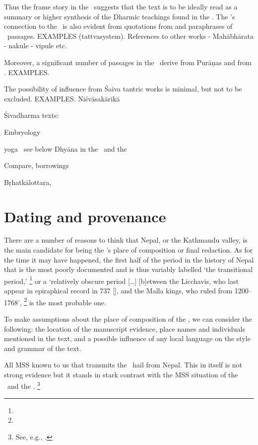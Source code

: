 \noindent
Thus the frame story in the \VSS\ suggests
that the text is to be ideally read as a summary 
or higher synthesis of the Dharmic teachings found
in the \MBH. The \VSS's connection to the \MBH\
is also evident from quotations from and paraphrases
of \MBH\ passages. EXAMPLES (tattvasystem).
  References to other works - Mahābhārata - nakule - vipule etc.

Moreover, a significant number of passages in 
the \VSS\ derive from Purāṇas and from \Manu. EXAMPLES.

The possibility of influence from Śaiva tantric works is
minimal, but not to be excluded. EXAMPLES.
Niśvāsakārikā



Śivadharma texts:
\label{vss_connection_other_sd_texts}


Embryology

yoga \DharmP\ see below
Dhyāna in the \VSS\ and the \DHARMP
\label{dharmaputrika}

Compare, borrowings

Bṛhatkālottara,








\section{Dating and provenance}
\label{provenance}
There are a number of reasons to think that
Nepal, or the Kathmandu valley, is the main
candidate for being the \VSS's place of composition
or final redaction. As for the time it may have 
happened, the first half of the period in the history of Nepal 
that is the most poorly documented and is thus 
variably labelled `the transitional period,'%
	\footnote{}
or a `relatively obscure period [\dots]
[b]etween the Licchavis, who last appear 
in epiraphical record in 737 [\CE], 
and the Malla kings, who ruled from 1200--1768',%
	\footnote{}
is the most probable one.

To make assumptions about the place of 
composition of the \VSS, we can consider 
the following: the location of the manuscript 
evidence, place names and individuals  
mentioned in the text, and a possible influence
of any local language on the style and grammar
of the text.

All MSS known to us that transmits the \VSS\ 
hail from Nepal. This in itself is not strong evidence
but it stands in stark contrast with the MSS situation
of the \SDHS\ and the \SDHU.%
		\footnote{See, e.g., \mycitep{UmaSivaPlay}{589}.}

